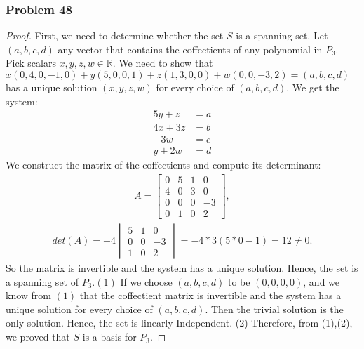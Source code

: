 \documentclass[a4paper,12pt]{article}
\begin{document}
\subsubsection*{Problem 48}
\begin{proof}
First, we need to determine whether the set $S$ is a spanning set. Let $(a,b,c,d)$ any vector that contains the coffectients of any polynomial in $P_3.$ Pick scalars $x,y,z,w \in \mathbb{R}$. We need to show that $x(0,4,0,-1,0)+y(5,0,0,1)+z(1,3,0,0)+w(0,0,-3,2)=(a,b,c,d)$ has a unique solution $(x,y,z,w)$ for every choice of $(a,b,c,d)$. We get the system: 
\begin{align*}
    5y + z         &= a \\
    4x + 3z        &= b \\
    -3w            &= c \\
    y + 2w         &= d
\end{align*}
We construct the matrix of the coffectients and compute its determinant:
\begin{align*}
    A=\begin{bmatrix}
        0&5&1&0\\
        4&0&3&0\\
        0&0&0&-3\\
        0&1&0&2
    \end{bmatrix},\end{align*} \begin{align*} det(A)=-4\begin{vmatrix}
        5&1&0\\
        0&0&-3\\
        1&0&2
    \end{vmatrix} = -4* 3 (5*0-1)=12 \neq 0.
\end{align*}
So the matrix is invertible and the system has a unique solution. Hence, the set is a spanning set of $P_3. (1)$
If we choose $(a,b,c,d)$ to be $(0,0,0,0)$, and we know from $(1)$ that the coffectient matrix is invertible and the system has a unique solution for every choice of $(a,b,c,d).$ Then the trivial solution is the only solution. Hence, the set is linearly Independent. (2)
Therefore, from (1),(2), we proved that $S$ is a basis for $P_3.$ 
\end{proof}
\end{document}
